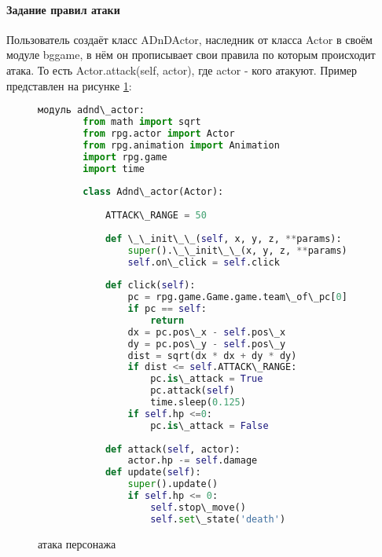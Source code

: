 \paragraph{Задание правил атаки}
Пользователь создаёт класс ADnDActor, наследник от класса Actor в своём модуле bggame, в нём он прописывает свои правила по которым происходит атака. То есть Actor.attack(self, actor), где actor - кого атакуют.
Пример представлен на рисунке \ref{attack:image}:
\begin{figure}[H]
	\begin{lstlisting}[language=Python]
		модуль adnd\_actor:
		from math import sqrt
		from rpg.actor import Actor
		from rpg.animation import Animation
		import rpg.game
		import time
		
		class Adnd\_actor(Actor):
		
			ATTACK\_RANGE = 50
		
			def \_\_init\_\_(self, x, y, z, **params):
				super().\_\_init\_\_(x, y, z, **params)
				self.on\_click = self.click
			
			def click(self):
				pc = rpg.game.Game.game.team\_of\_pc[0]
				if pc == self:
					return
				dx = pc.pos\_x - self.pos\_x
				dy = pc.pos\_y - self.pos\_y
				dist = sqrt(dx * dx + dy * dy)
				if dist <= self.ATTACK\_RANGE:
					pc.is\_attack = True
					pc.attack(self)
					time.sleep(0.125)
				if self.hp <=0:
					pc.is\_attack = False
		
			def attack(self, actor):
				actor.hp -= self.damage
			def update(self):
				super().update()
				if self.hp <= 0:
					self.stop\_move()
					self.set\_state('death')
\end{lstlisting}  
\caption{атака персонажа}
\label{attack:image}
\end{figure}


